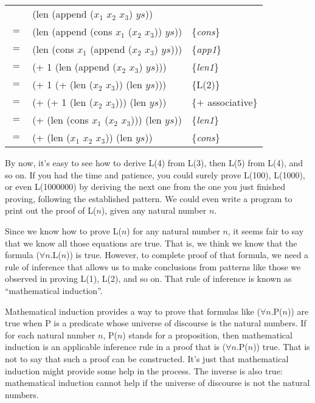 \begin{center}
\begin{tabular}{lll}
    & (len (append ($x_1$ $x_2$ $x_3$) $ys$))         &                     \\
$=$ & (len (append (cons $x_1$ ($x_2$ $x_3$)) $ys$))  & \{\emph{cons}\}     \\
$=$ & (len (cons $x_1$ (append ($x_2$ $x_3$) $ys$)))  & \{\emph{app1}\}     \\
$=$ & (+ 1 (len (append ($x_2$ $x_3$) $ys$)))         & \{\emph{len1}\}     \\
$=$ & (+ 1 (+ (len ($x_2$ $x_3$)) (len $ys$)))        & \{L(2)\}            \\
$=$ & (+ (+ 1 (len ($x_2$ $x_3$))) (len $ys$))        & \{$+$ associative\} \\
$=$ & (+ (len (cons $x_1$ ($x_2$ $x_3$))) (len $ys$)) & \{\emph{len1}\}     \\
$=$ & (+ (len ($x_1$ $x_2$ $x_3$)) (len $ys$))        & \{\emph{cons}\}     \\
\end{tabular}
\end{center}

By now, it's easy to see how to derive L(4) from L(3), 
then L(5) from L(4), and so on. 
If you had the time and patience, you could surely prove L(100), L(1000), or even L(1000000) 
by deriving the next one from the one you just finished proving, 
following the established pattern. 
We could even write a program to print out the proof of L($n$), given any natural number $n$.

Since we know how to prove L($n$) for any natural number $n$, 
it seems fair to say that we know all those equations are true. 
That is, we think we know that the formula ($\forall$$n$.L($n$)) is true.
However, to complete proof of that formula, 
we need a rule of inference that allows us to make conclusions 
from patterns like those we observed in proving L(1), L(2), and so on. 
That rule of inference is known as ``mathematical induction''.

Mathematical induction provides a way to prove that 
formulas like ($\forall$$n$.P($n$)) are true 
when P is a predicate whose universe of discourse is the natural numbers. 
If for each natural number $n$, P($n$) stands for a proposition, 
then mathematical induction is an applicable inference rule 
in a proof that is ($\forall$$n$.P($n$)) true. 
That is not to say that such a proof can be constructed. 
It's just that mathematical induction might provide some help in the process.
The inverse is also true: mathematical induction cannot help
if the universe of discourse is not the natural numbers.

